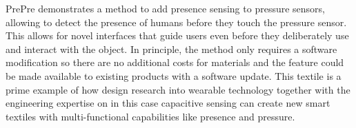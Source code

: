 \documentclass{sigchi-ext}
\begin{document}
PrePre demonstrates a method to add presence sensing to pressure sensors, allowing to detect the presence of humans before they touch the pressure sensor. This allows for novel interfaces that guide users even before they deliberately use and interact with the object. In principle, the method only requires a software modification so there are no additional costs for materials and the feature could be made available to existing products with a software update. This textile is a prime example of how design research into wearable technology together with the engineering expertise on in this case capacitive sensing can create new smart textiles with multi-functional capabilities like presence and pressure. 
\end{document}
